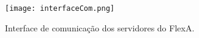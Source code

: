         \begin{figure}
        \centering
        \texttt{[image: interfaceCom.png]}
        \caption{Interface de comunicação dos servidores do FlexA.}
        \label{fig:interfaceComunicação}
        \end{figure}
        
        
        
        
        
        
           
        
        
        
        
        
        
        
        
        
        
        
        
        
        
        
        
        
        
        
        
        
        
        
        
        
        
        
        